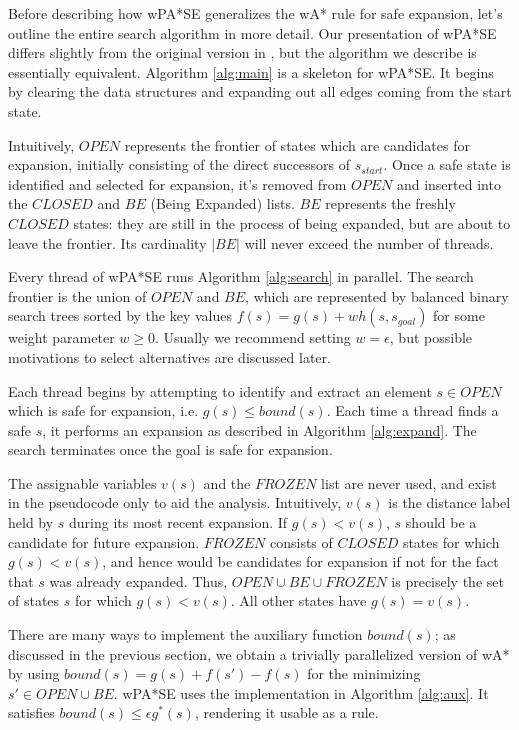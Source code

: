 \documentclass[letterpaper]{article}
\begin{document}
Before describing how wPA*SE generalizes the wA* rule for safe expansion, let's outline the entire search algorithm in more detail. Our presentation of wPA*SE differs slightly from the original version in \cite{phillips2014pa}, but the algorithm we describe is essentially equivalent. Algorithm \ref{alg:main} is a skeleton for wPA*SE. It begins by clearing the data structures and expanding out all edges coming from the start state.

Intuitively, $OPEN$ represents the frontier of states which are candidates for expansion, initially consisting of the direct successors of $s_{start}$. Once a safe state is identified and selected for expansion, it's removed from $OPEN$ and inserted into the $CLOSED$ and $BE$ (Being Expanded) lists. $BE$ represents the freshly $CLOSED$ states: they are still in the process of being expanded, but are about to leave the frontier. Its cardinality $|BE|$ will never exceed the number of threads.

Every thread of wPA*SE runs Algorithm \ref{alg:search} in parallel. The search frontier is the union of $OPEN$ and $BE$, which are represented by balanced binary search trees sorted by the key values $f(s) = g(s) + wh(s,s_{goal})$ for some weight parameter $w\ge 0$. Usually we recommend setting $w=\epsilon$, but possible motivations to select alternatives are discussed later.

Each thread begins by attempting to identify and extract an element $s\in OPEN$ which is safe for expansion, i.e. $g(s)\le bound(s)$. Each time a thread finds a safe $s$, it performs an expansion as described in Algorithm \ref{alg:expand}. The search terminates once the goal is safe for expansion.

The assignable variables $v(s)$ and the $FROZEN$ list are never used, and exist in the pseudocode only to aid the analysis. Intuitively, $v(s)$ is the distance label held by $s$ during its most recent expansion. If $g(s) < v(s)$, $s$ should be a candidate for future expansion. $FROZEN$ consists of $CLOSED$ states for which $g(s) < v(s)$, and hence would be candidates for expansion if not for the fact that $s$ was already expanded. Thus, $OPEN\cup BE\cup FROZEN$ is precisely the set of states $s$ for which $g(s) < v(s)$. All other states have $g(s) = v(s)$.

There are many ways to implement the auxiliary function $bound(s)$; as discussed in the previous section, we obtain a trivially parallelized version of wA* by using $bound(s) = g(s) + f(s') - f(s)$ for the minimizing $s'\in OPEN \cup BE$. wPA*SE uses the implementation in Algorithm \ref{alg:aux}. It satisfies $bound(s) \le \epsilon g^*(s)$, rendering it usable as a rule.
\end{document}
